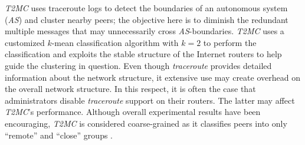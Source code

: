 \emph{T2MC} \cite{SLCGZ2008} uses traceroute logs to detect 
the boundaries of an autonomous system (\emph{AS}) and
cluster nearby peers; the objective here is to 
diminish the redundant multiple messages that may 
unnecessarily cross \emph{AS}-boundaries.
\emph{T2MC} uses a customized $k$-mean classification
algorithm with $k = 2$ to perform the classification 
and exploits the stable structure of the Internet routers 
to help guide the clustering in question. 
Even though {\sl traceroute}
provides detailed information about the network structure, 
it extensive use may create overhead on the overall network structure. 
In this respect, it is often the case that administrators 
disable {\sl traceroute} support on their routers.
The latter may affect \emph{T2MC}'s performance.
Although overall experimental results have been encouraging, 
\emph{T2MC} is considered coarse-grained
as it classifies peers into only ``remote'' and ``close''
groups \cite{QLZG2009}.
%
